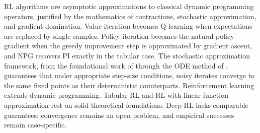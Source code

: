RL algorithms are asymptotic approximations to classical dynamic programming operators, justified by the mathematics of contractions, stochastic approximation, and gradient domination. Value iteration becomes Q-learning \citep{WatkinsDayan1992, tsitsiklis1994} when expectations are replaced by single samples. Policy iteration becomes the natural policy gradient \citep{Kakade2001, agarwal2021theory} when the greedy improvement step is approximated by gradient ascent, and NPG recovers PI exactly in the tabular case. The stochastic approximation framework, from the foundational work of \citet{robbinsmonro1951} through the ODE method of \citet{borkar2000}, guarantees that under appropriate step-size conditions, noisy iterates converge to the same fixed points as their deterministic counterparts. Reinforcement learning extends dynamic programming. Tabular RL and RL with linear function approximation rest on solid theoretical foundations. Deep RL lacks comparable guarantees: convergence remains an open problem, and empirical successes remain case-specific.
